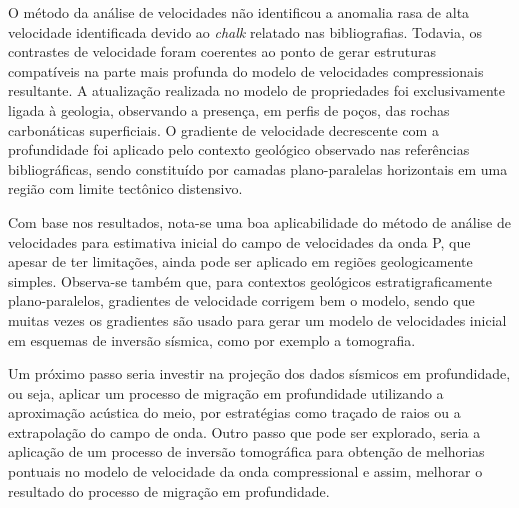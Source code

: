 \documentclass[
	12pt,				%
	openright,			%
	oneside,			%
	a4paper,			%
	english,			%
	brazil				%
	]{abntex2}
\begin{document}
	O método da análise de velocidades não identificou a anomalia rasa de alta velocidade identificada devido ao \textit{chalk} relatado nas bibliografias. Todavia, os contrastes de velocidade foram coerentes ao ponto de gerar estruturas compatíveis na parte mais profunda  do modelo de velocidades compressionais resultante. A atualização realizada no modelo de propriedades foi exclusivamente ligada à geologia, observando a presença, em perfis de poços, das rochas carbonáticas superficiais. O gradiente de velocidade decrescente com a profundidade foi aplicado pelo contexto geológico observado nas referências bibliográficas, sendo constituído por camadas plano-paralelas horizontais em uma região com limite tectônico distensivo.           
	
	Com base nos resultados, nota-se uma boa aplicabilidade do método de análise de velocidades para estimativa inicial do campo de velocidades da onda P, que apesar de ter limitações, ainda pode ser aplicado em regiões geologicamente simples. Observa-se também que, para contextos geológicos estratigraficamente plano-paralelos, gradientes de velocidade corrigem bem o modelo, sendo que muitas vezes os gradientes são usado para gerar um modelo de velocidades inicial em esquemas de inversão sísmica, como por exemplo a tomografia.
	
	Um próximo passo seria investir na projeção dos dados sísmicos em profundidade, ou seja, aplicar um processo de migração em profundidade utilizando a aproximação acústica do meio, por estratégias como traçado de raios ou a extrapolação do campo de onda. Outro passo que pode ser explorado, seria a aplicação de um processo de inversão tomográfica para obtenção de melhorias pontuais no modelo de velocidade da onda compressional e assim, melhorar o resultado do processo de migração em profundidade.    

\postextual


\end{document}
